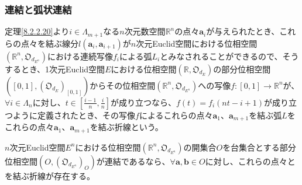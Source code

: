 \documentclass[dvipdfmx]{jsarticle}
\begin{document}
\subsubsection{連結と弧状連結}%
\begin{dfn} 定理\ref{8.2.2.20}より$i \in \varLambda_{m + 1}$なる$n$次元数空間$\mathbb{R}^{n}$の点々$\mathbf{a}_{i}$が与えられたとき、これらの点々を結ぶ線分$l\left( \mathbf{a}_{i},\mathbf{a}_{i + 1} \right)$が$n$次元Euclid空間における位相空間$\left( \mathbb{R}^{n},\mathfrak{O}_{d_{E^{n}}} \right)$における連続写像$f_{i}$による弧$L_{i}$とみなされることができるので、そうするとき、1次元Euclid空間$E$における位相空間$\left( \mathbb{R},\mathfrak{O}_{d_{E}} \right)$の部分位相空間$\left( [ 0,1],\left( \mathfrak{O}_{d_{E}} \right)_{[ 0,1]} \right)$からその位相空間$\left( \mathbb{R}^{n},\mathfrak{O}_{d_{E^{n}}} \right)$への写像$f:[ 0,1] \rightarrow \mathbb{R}^{n}$が、$\forall i \in \varLambda_{n}$に対し、$t \in \left[ \frac{i - 1}{n},\frac{i}{n} \right]$が成り立つなら、$f(t) = f_{i}(nt - i + 1)$が成り立つように定義されたとき、その写像$f$によるこれらの点々$\mathbf{a}_{1}$、$\mathbf{a}_{m + 1}$を結ぶ弧$L$をこれらの点々$\mathbf{a}_{1}$、$\mathbf{a}_{m + 1}$を結ぶ折線という。
\end{dfn}
\begin{thm}\label{8.2.2.23}
$n$次元Euclid空間$E^{n}$における位相空間$\left( \mathbb{R}^{n},\mathfrak{O}_{d_{E^{n}}} \right)$の開集合$O$を台集合とする部分位相空間$\left( O,\left( \mathfrak{O}_{d_{E^{n}}} \right)_{O} \right)$が連結であるなら、$\forall\mathbf{a},\mathbf{b} \in O$に対し、これらの点々とを結ぶ折線が存在する。
\end{thm}
\end{document}
